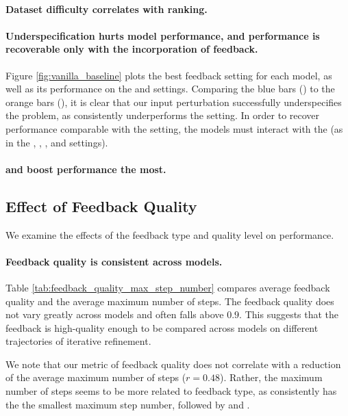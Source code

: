 
\paragraph{Dataset difficulty correlates with ranking.}

\paragraph{Underspecification hurts model performance, and performance is recoverable only with the incorporation of feedback.}

Figure \ref{fig:vanilla_baseline} plots the best feedback setting for each model, as well as its performance on the \baseline{} and \vanilla{} settings. 
Comparing the blue bars (\vanilla) to the orange bars (\baseline), it is clear that our input perturbation successfully underspecifies the problem, as \baseline{}  consistently underperforms the \vanilla{} setting. 
In order to recover performance comparable with the \vanilla{} setting, the models must interact with the \user{} (as in the \para, \sent, \cf, and \ir{} settings).

\paragraph{\cf{} and \para{} boost performance the most.}


\subsection{Effect of Feedback Quality}
We examine the effects of the feedback type and quality level on performance. 


\paragraph{Feedback quality is consistent across models.}
Table \ref{tab:feedback_quality_max_step_number} compares average feedback quality and the average maximum number of steps.
The feedback quality does not vary greatly across models and often falls above $0.9$.
This suggests that the feedback is high-quality enough to be compared across models on different trajectories of iterative refinement. 

We note that our metric of feedback quality does not correlate with a reduction of the average maximum number of steps ($r=0.48$).
Rather, the maximum number of steps seems to be more related to feedback type, as \cf{} consistently has the the smallest maximum step number, followed by \para{} and \sent.

